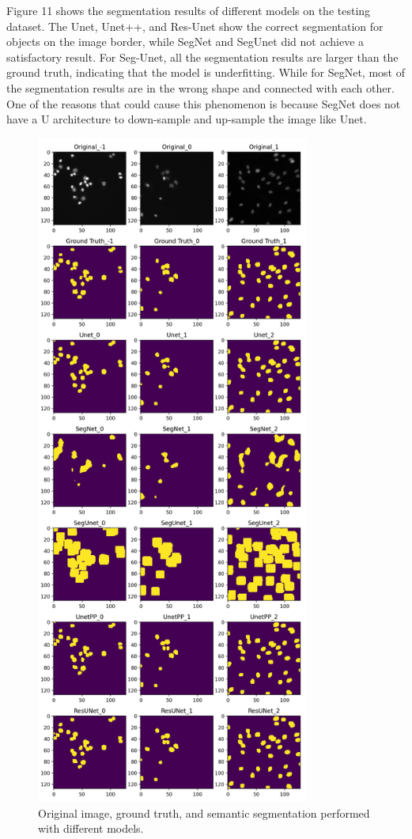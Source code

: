 \documentclass{article}
\begin{document}
Figure 11 shows the segmentation results of different models on the testing dataset. The Unet, Unet++, and Res-Unet show the correct segmentation for objects on the image border, while SegNet and SegUnet did not achieve a satisfactory result. For Seg-Unet, all the segmentation results are larger than the ground truth, indicating that the model is underfitting. While for SegNet, most of the segmentation results are in the wrong shape and connected with each other. One of the reasons that could cause this phenomenon is because SegNet does not have a U architecture to down-sample and up-sample the image like Unet.
\begin{figure}[H]
    \centering
    \includegraphics[width=9cm]{SegmentationResults.png}
    \caption{Original image, ground truth, and semantic segmentation performed with different models.}
    \label{2}
\end{figure}
\end{document}
